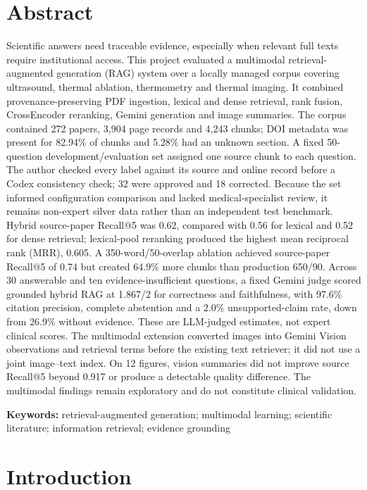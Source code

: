 \documentclass[11pt,a4paper]{article}
\begin{document}
\section*{Abstract}

Scientific answers need traceable evidence, especially when relevant full texts require institutional access. This project evaluated a multimodal retrieval-augmented generation (RAG) system over a locally managed corpus covering ultrasound, thermal ablation, thermometry and thermal imaging. It combined provenance-preserving PDF ingestion, lexical and dense retrieval, rank fusion, CrossEncoder reranking, Gemini generation and image summaries. The corpus contained 272 papers, 3,904 page records and 4,243 chunks; DOI metadata was present for 82.94\% of chunks and 5.28\% had an unknown section. A fixed 50-question development/evaluation set assigned one source chunk to each question. The author checked every label against its source and online record before a Codex consistency check; 32 were approved and 18 corrected. Because the set informed configuration comparison and lacked medical-specialist review, it remains non-expert silver data rather than an independent test benchmark. Hybrid source-paper Recall@5 was 0.62, compared with 0.56 for lexical and 0.52 for dense retrieval; lexical-pool reranking produced the highest mean reciprocal rank (MRR), 0.605. A 350-word/50-overlap ablation achieved source-paper Recall@5 of 0.74 but created 64.9\% more chunks than production 650/90. Across 30 answerable and ten evidence-insufficient questions, a fixed Gemini judge scored grounded hybrid RAG at 1.867/2 for correctness and faithfulness, with 97.6\% citation precision, complete abstention and a 2.0\% unsupported-claim rate, down from 26.9\% without evidence. These are LLM-judged estimates, not expert clinical scores. The multimodal extension converted images into Gemini Vision observations and retrieval terms before the existing text retriever; it did not use a joint image--text index. On 12 figures, vision summaries did not improve source Recall@5 beyond 0.917 or produce a detectable quality difference. The multimodal findings remain exploratory and do not constitute clinical validation.

\noindent\textbf{Keywords:} retrieval-augmented generation; multimodal learning; scientific literature; information retrieval; evidence grounding

\FloatBarrier
\section{Introduction}
\label{sec:introduction}
\end{document}
